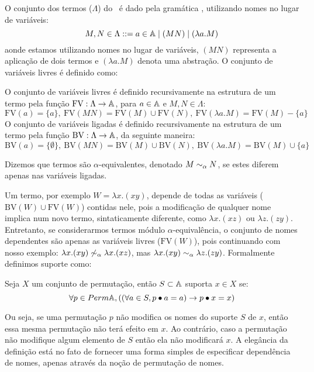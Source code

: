 O conjunto dos termos ($\Lambda$) do \lcalc~é dado pela gramática \cite{Hindley2008}, utilizando nomes no lugar de variáveis:
\begin{equation*}
	M, N \in \Lambda ::= a \in \mathbb{A} \mid (M N) \mid (\lambda a . M)
\end{equation*}
aonde estamos utilizando nomes no lugar de variáveis, $(M N)$ representa a aplicação de dois termos e $(\lambda a . M)$ denota uma abstração. O conjunto de variáveis livres é definido como:
\begin{definicao}
	O conjunto de variáveis livres é definido recursivamente na estrutura de um termo pela função $\text{FV}: \Lambda \rightarrow \mathbb{A}$, para $a \in \mathbb{A}$ e $M, N \in \Lambda$:
	\begin{equation*}
		\text{FV}(a) = \{a\}, ~ \text{FV}(MN) = \text{FV}(M) \cup \text{FV}(N), ~
		\text{FV}(\lambda a . M) = \text{FV}(M) - \{a\}
	\end{equation*}
	O conjunto de variáveis ligadas é definido recursivamente na estrutura de um termo pela função $\text{BV}: \Lambda \rightarrow \mathbb{A}$, da seguinte maneira:
	\begin{equation*}
		\text{BV}(a) = \{\emptyset\}, ~ \text{BV}(MN) = \text{BV}(M) \cup \text{BV}(N), ~
		\text{BV}(\lambda a . M) = \text{BV}(M) \cup \{a\}
	\end{equation*}
\end{definicao}\noindent
Dizemos que termos são $\alpha$-equivalentes, denotado $M \sim_{\alpha} N$, se estes diferem apenas nas variáveis ligadas.

Um termo, por exemplo $W = \lambda x. (xy)$, depende de todas as variáveis ($\text{BV}(W) \cup \text{FV}(W)$) contidas nele, pois a modificação de qualquer nome implica num novo termo, sintaticamente diferente, como $\lambda x. (xz)$ ou $\lambda z. (zy)$. Entretanto, se considerarmos termos módulo $\alpha$-equivalência, o conjunto de nomes dependentes são apenas as variáveis livres ($\text{FV}(W)$), pois continuando com nosso exemplo: $\lambda x. (xy) \not\sim_{\alpha} \lambda x. (xz)$, mas $\lambda x. (xy) \sim_{\alpha} \lambda z. (zy)$. Formalmente definimos suporte como:
\begin{definicao}[Suporte]
	Seja $X$ um conjunto de permutação, então $S \subset \mathbb{A}$ suporta $x \in X$ se:
	\begin{equation}\label{eq:suporte}
		\forall p \in Perm \mathbb{A}, ((\forall a \in S, p \bullet a = a) \rightarrow p \bullet x = x)
	\end{equation}
\end{definicao}\noindent
Ou seja, se uma permutação $p$ não modifica os nomes do suporte $S$ de $x$, então essa mesma permutação não terá efeito em $x$. Ao contrário, caso a permutação não modifique algum elemento de $S$ então ela não modificará $x$. A elegância da definição está no fato de fornecer uma forma simples de especificar dependência de nomes, apenas através da noção de permutação de nomes.

